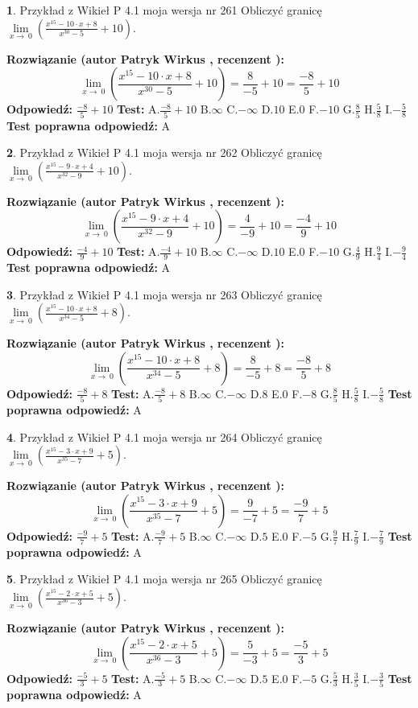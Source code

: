 \documentclass[12pt, a4paper]{article}
\theoremstyle{definition} %
\newtheorem{zad}{}
\newcommand{\zadStart}[1]{\begin{zad}#1\newline}
\newcommand{\zadStop}{\end{zad}}
\newcommand{\rozwStart}[2]{\noindent \textbf{Rozwiązanie (autor #1 , recenzent #2): }\newline}
\newcommand{\rozwStop}{\newline}
\newcommand{\odpStart}{\noindent \textbf{Odpowiedź:}\newline}
\newcommand{\odpStop}{\newline}
\newcommand{\testStart}{\noindent \textbf{Test:}\newline}
\newcommand{\testStop}{\newline}
\newcommand{\kluczStart}{\noindent \textbf{Test poprawna odpowiedź:}\newline}
\newcommand{\kluczStop}{\newline}
\begin{document}
\zadStart{Przykład z Wikieł P 4.1 moja wersja nr 261}
Obliczyć granicę $\lim\limits_{x\to\ 0}(\frac{x^{15}-10 \cdot x +8}{x^{30}-5}+10)$.
\zadStop
\rozwStart{Patryk Wirkus}{}
$$\lim\limits_{x\to\ 0}(\frac{x^{15}-10 \cdot x +8}{x^{30}-5}+10)=\frac{8}{-5}+10=\frac{-8}{5}+10$$
\rozwStop
\odpStart
$\frac{-8}{5}+10$
\odpStop
\testStart
A.$\frac{-8}{5}+10$
B.$\infty$
C.$-\infty$
D.$10$
E.$0$
F.$-10$
G.$\frac{8}{5}$
H.$\frac{5}{8}$
I.$-\frac{5}{8}$
\testStop
\kluczStart
A
\kluczStop



\zadStart{Przykład z Wikieł P 4.1 moja wersja nr 262}
Obliczyć granicę $\lim\limits_{x\to\ 0}(\frac{x^{15}-9 \cdot x +4}{x^{32}-9}+10)$.
\zadStop
\rozwStart{Patryk Wirkus}{}
$$\lim\limits_{x\to\ 0}(\frac{x^{15}-9 \cdot x +4}{x^{32}-9}+10)=\frac{4}{-9}+10=\frac{-4}{9}+10$$
\rozwStop
\odpStart
$\frac{-4}{9}+10$
\odpStop
\testStart
A.$\frac{-4}{9}+10$
B.$\infty$
C.$-\infty$
D.$10$
E.$0$
F.$-10$
G.$\frac{4}{9}$
H.$\frac{9}{4}$
I.$-\frac{9}{4}$
\testStop
\kluczStart
A
\kluczStop



\zadStart{Przykład z Wikieł P 4.1 moja wersja nr 263}
Obliczyć granicę $\lim\limits_{x\to\ 0}(\frac{x^{15}-10 \cdot x +8}{x^{34}-5}+8)$.
\zadStop
\rozwStart{Patryk Wirkus}{}
$$\lim\limits_{x\to\ 0}(\frac{x^{15}-10 \cdot x +8}{x^{34}-5}+8)=\frac{8}{-5}+8=\frac{-8}{5}+8$$
\rozwStop
\odpStart
$\frac{-8}{5}+8$
\odpStop
\testStart
A.$\frac{-8}{5}+8$
B.$\infty$
C.$-\infty$
D.$8$
E.$0$
F.$-8$
G.$\frac{8}{5}$
H.$\frac{5}{8}$
I.$-\frac{5}{8}$
\testStop
\kluczStart
A
\kluczStop



\zadStart{Przykład z Wikieł P 4.1 moja wersja nr 264}
Obliczyć granicę $\lim\limits_{x\to\ 0}(\frac{x^{15}-3 \cdot x +9}{x^{35}-7}+5)$.
\zadStop
\rozwStart{Patryk Wirkus}{}
$$\lim\limits_{x\to\ 0}(\frac{x^{15}-3 \cdot x +9}{x^{35}-7}+5)=\frac{9}{-7}+5=\frac{-9}{7}+5$$
\rozwStop
\odpStart
$\frac{-9}{7}+5$
\odpStop
\testStart
A.$\frac{-9}{7}+5$
B.$\infty$
C.$-\infty$
D.$5$
E.$0$
F.$-5$
G.$\frac{9}{7}$
H.$\frac{7}{9}$
I.$-\frac{7}{9}$
\testStop
\kluczStart
A
\kluczStop



\zadStart{Przykład z Wikieł P 4.1 moja wersja nr 265}
Obliczyć granicę $\lim\limits_{x\to\ 0}(\frac{x^{15}-2 \cdot x +5}{x^{36}-3}+5)$.
\zadStop
\rozwStart{Patryk Wirkus}{}
$$\lim\limits_{x\to\ 0}(\frac{x^{15}-2 \cdot x +5}{x^{36}-3}+5)=\frac{5}{-3}+5=\frac{-5}{3}+5$$
\rozwStop
\odpStart
$\frac{-5}{3}+5$
\odpStop
\testStart
A.$\frac{-5}{3}+5$
B.$\infty$
C.$-\infty$
D.$5$
E.$0$
F.$-5$
G.$\frac{5}{3}$
H.$\frac{3}{5}$
I.$-\frac{3}{5}$
\testStop
\kluczStart
A
\kluczStop
\end{document}
